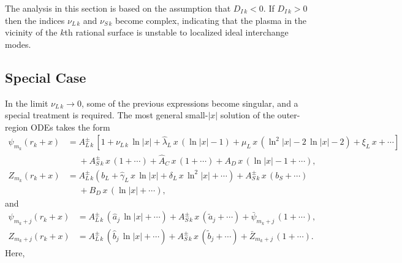 \documentclass[12pt,prb,aps]{revtex4-1}
\begin{document}
The  analysis in this section is based on the assumption that $ D_{I\,k}< 0$.
 If $D_{I\,k}>0$ then the indices $\nu_{L\,k}$ and $\nu_{S\,k}$ become
complex, indicating that the plasma in the vicinity of the $k$th rational surface is unstable to localized ideal interchange modes.\cite{mercier}

\subsection{Special Case}\label{sspec}
In the limit $\nu_{L\,k}\rightarrow 0$, some of the previous expressions become singular, and a special treatment is required. The most general small-$|x|$ solution of the outer-region ODEs 
takes the form
\begin{align}
\psi_{m_k}(r_k+x)&=A_{L\,k}^\pm \,[1+\nu_{L\,k}\,\ln|x|+\hat{\lambda}_{L}\,x\,(\ln |x|-1)+\mu_{L}\,x\,(\ln^2\!|x|-2\,\ln|x|-2) + \xi_{L}\,x+\cdots]  \nonumber\\[0.5ex]&\phantom{=}+ A_{S\,k}^{\pm}\,x\,(1+\cdots) + \hat{A}_{C}\,x\,(1+\cdots)+ A_{D}\,x\,(\ln |x|-1 + \cdots),\\[0.5ex]
Z_{m_k}(r_k+x)&= A_{L\,k}^\pm\left(b_L+\hat{\gamma}_{L}\,x\,\ln |x|+\delta_{L}\,x\,\ln^2\!|x|+\cdots\right) +A_{S\,k}^\pm\,x\,(b_{S}+\cdots)\nonumber\\[0.5ex]&\phantom{=} + B_{D}\,x\,(\ln |x|+\cdots),
\end{align}
and 
\begin{align}
\psi_{m_k+j}(r_k+x)&=A_{L\,k}^\pm\,(\hat{a}_j\,\ln |x|+\cdots)+A_{S\,k}^\pm\,x\,(\tilde{a}_j+\cdots)  + \bar{\psi}_{m_k+j}\,(1+\cdots),\\[0.5ex]
Z_{m_k+j}(r_k+x)&= A_{L\,k}^\pm\,(\hat{b}_j \,\ln |x|+ \cdots) +  A_{S\,k}^\pm\,x\,(\tilde{b}_j + \cdots) +\bar{Z}_{m_k+j}\,(1+\cdots).
\end{align}
Here, 
\end{document}
